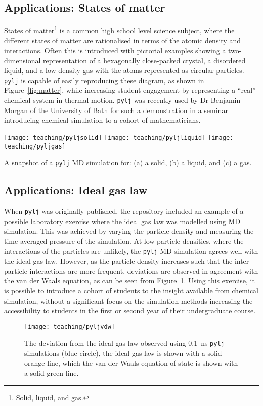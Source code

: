 \subsection{Applications: States of matter}
States of matter\footnote{Solid, liquid, and gas.} is a common high school level science subject, where the different states of matter are rationalised in terms of the atomic density and interactions.
Often this is introduced with pictorial examples showing a two-dimensional representation of a hexagonally close-packed crystal, a disordered liquid, and a low-density gas with the atoms represented as circular particles.
\texttt{pylj} is capable of easily reproducing these diagram, as shown in Figure~\ref{fig:matter}, while increasing student engagement by representing a ``real'' chemical system in thermal motion.
\texttt{pylj} was recently used by Dr Benjamin Morgan of the University of Bath for such a demonstration in a seminar introducing chemical simulation to a cohort of mathematicians.
%
\begin{marginfigure}
    \centering
    \texttt{[image: teaching/pyljsolid]}
    \texttt{[image: teaching/pyljliquid]}
    \texttt{[image: teaching/pyljgas]}
    \caption{A snapshot of a \texttt{pylj} MD simulation for: (a) a solid, (b) a liquid, and (c) a gas.}
    \label{fig:matter}
\end{marginfigure}
%

\subsection{Applications: Ideal gas law}
When \texttt{pylj} was originally published,\autocite{mccluskey_pylj_2018} the repository included an example of a possible laboratory exercise where the ideal gas law was modelled using MD simulation.
This was achieved by varying the particle density and measuring the time-averaged pressure of the simulation.
At low particle densities, where the interactions of the particles are unlikely, the \texttt{pylj} MD simulation agrees well with the ideal gas law.
However, as the particle density increases such that the inter-particle interactions are more frequent, deviations are observed in agreement with the van der Waals equation, as can be seen from Figure~\ref{fig:vdw}.
Using this exercise, it is possible to introduce a cohort of students to the insight available from chemical simulation, without a significant focus on the simulation methods increasing the accessibility to students in the first or second year of their undergraduate course.
%
\begin{figure}
    \centering
    \texttt{[image: teaching/pyljvdw]}
    \caption{The deviation from the ideal gas law observed using \SI{0.1}{\nano\second} \texttt{pylj} simulations (blue circle), the ideal gas law is shown with a solid orange line, which the van der Waals equation of state is shown with a solid green line.}
    \label{fig:vdw}
\end{figure}
%

